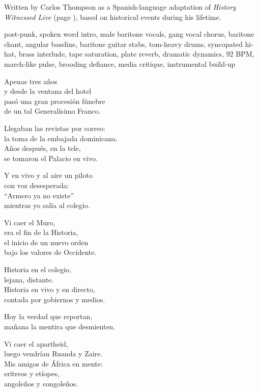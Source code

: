 
\begin{notes}
Written by Carlos Thompson as a Spanish-language adaptation of \emph{History Witnessed Live} (page \pageref{sec:history-witnessed-live}), based on historical events during his lifetime.
\end{notes}
\begin{style}
post-punk, spoken word intro, male baritone vocals, gang vocal chorus, baritone chant, angular bassline, baritone guitar stabs, tom-heavy drums, syncopated hi-hat, brass interlude, tape saturation, plate reverb, dramatic dynamics, 92 BPM, march-like pulse, brooding defiance, media critique, instrumental build-up
\end{style}
\begin{lyrics}
Apenas tres años\\
y desde la ventana del hotel\\
pasó una gran procesión fúnebre\\
de un tal Generalísimo Franco.

Llegaban las revistas por correo:\\
la toma de la embajada dominicana.\\
Años después, en la tele,\\
se tomaron el Palacio en vivo.

Y en vivo y al aire un piloto\\
con voz desesperada:\\
“Armero ya no existe”\\
mientras yo salía al colegio.

Vi caer el Muro,\\
era el fin de la Historia,\\
el inicio de un nuevo orden\\
bajo los valores de Occidente.

Historia en el colegio,\\
lejana, distante.\\
Historia en vivo y en directo,\\
contada por gobiernos y medios.

Hoy la verdad que reportan,\\
mañana la mentira que desmienten.

Vi caer el apartheid,\\
luego vendrían Ruanda y Zaire.\\
Mis amigos de África en mente:\\
eritreos y etíopes,\\
angoleños y congoleños.


\end{lyrics}
